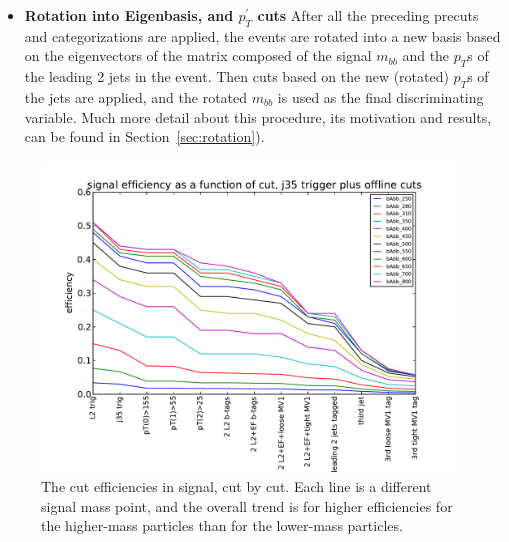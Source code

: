 \begin{itemize}
\item 
\textbf{Rotation into Eigenbasis, and $p_T^{'}$ cuts}
After all the preceding precuts and categorizations are applied, the events
are rotated into a new basis based on the eigenvectors of the matrix composed of the
signal $m_{bb}$ and the $p_T$s of the leading 2 jets in the event.  Then cuts
based on the new (rotated) $p_T$s of the jets are applied, and the rotated $m_{bb}$
is used as the final discriminating variable.  Much more detail about this procedure,
its motivation and results, can be found in Section~\ref{sec:rotation}).



\end{itemize}



\begin{figure}
    \center
	\includegraphics[width=0.98\textwidth]{TriggerCuts/cut_efficiencies_j35_signal.pdf}	
    \caption{The cut efficiencies in signal, cut by cut.  Each line is a different
    signal mass point, and the overall trend is for higher efficiencies for the higher-mass
    particles than for the lower-mass particles. \label{fig:signal_eff_cutflow}}
\end{figure}







